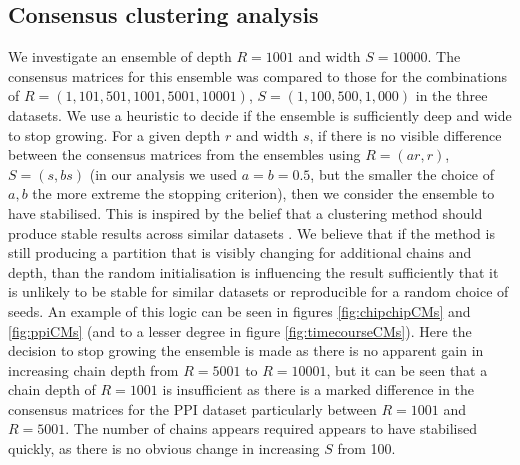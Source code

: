 \documentclass[]{article}
\begin{document}
\subsection{Consensus clustering analysis} \label{sec:consensusClustering}
We investigate an ensemble of depth $R=1001$ and width $S=10000$. The consensus matrices for this ensemble was compared to those for the combinations of $R = (1, 101, 501, 1001, 5001, 10001)$, $S=(1, 100, 500, 1,000)$ in the three datasets. We use a heuristic to decide if the ensemble is sufficiently deep and wide to stop growing. For a given depth $r$ and width $s$, if there is no visible difference between the consensus matrices from the ensembles using $R=(a r, r)$, $S=(s, b s)$ (in our analysis we used $a=b=0.5$, but the smaller the choice of $a,b$ the more extreme the stopping criterion), then we consider the ensemble to have stabilised. This is inspired by the belief that a clustering method should produce stable results across similar datasets \citep{von2005towards, meinshausen2010stability}. We believe that if the method is still producing a partition that is visibly changing for additional chains and depth, than the random initialisation is influencing the result sufficiently that it is unlikely to be stable for similar datasets or reproducible for a random choice of seeds. An example of this logic can be seen in figures \ref{fig:chipchipCMs} and \ref{fig:ppiCMs} (and to a lesser degree in figure \ref{fig:timecourseCMs}). Here the decision to stop growing the ensemble is made as there is no apparent gain in increasing chain depth from $R=5001$ to $R=10001$, but it can be seen that a chain depth of $R=1001$ is insufficient as there is a marked difference in the consensus matrices for the PPI dataset particularly between $R=1001$ and $R=5001$. The number of chains appears required appears to have stabilised quickly, as there is no obvious change in increasing $S$ from 100.
\end{document}
